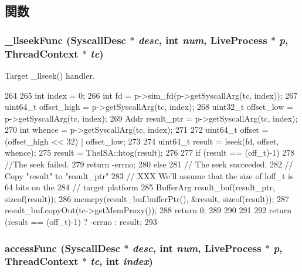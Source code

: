 \subsection{関数}
\hypertarget{syscall__emul_8hh_ab86e19440d57fb509cde4f13d38fffda}{
\subsubsection[{\_\-llseekFunc}]{ \_\-llseekFunc ({\bf SyscallDesc} $\ast$ {\em desc}, \/  int {\em num}, \/  {\bf LiveProcess} $\ast$ {\em p}, \/  {\bf ThreadContext} $\ast$ {\em tc})}}
\label{syscall__emul_8hh_ab86e19440d57fb509cde4f13d38fffda}


Target \_\-llseek() handler. 


\begin{DoxyCode}
264 {
265     int index = 0;
266     int fd = p->sim_fd(p->getSyscallArg(tc, index));
267     uint64_t offset_high = p->getSyscallArg(tc, index);
268     uint32_t offset_low = p->getSyscallArg(tc, index);
269     Addr result_ptr = p->getSyscallArg(tc, index);
270     int whence = p->getSyscallArg(tc, index);
271 
272     uint64_t offset = (offset_high << 32) | offset_low;
273 
274     uint64_t result = lseek(fd, offset, whence);
275     result = TheISA::htog(result);
276 
277     if (result == (off_t)-1) {
278         //The seek failed.
279         return -errno;
280     } else {
281         // The seek succeeded.
282         // Copy "result" to "result_ptr"
283         // XXX We'll assume that the size of loff_t is 64 bits on the
284         // target platform
285         BufferArg result_buf(result_ptr, sizeof(result));
286         memcpy(result_buf.bufferPtr(), &result, sizeof(result));
287         result_buf.copyOut(tc->getMemProxy());
288         return 0;
289     }
290 
291 
292     return (result == (off_t)-1) ? -errno : result;
293 }
\end{DoxyCode}
\hypertarget{syscall__emul_8hh_ad87b62dfcfe55b889d00d3054659a060}{
\subsubsection[{accessFunc}]{ accessFunc ({\bf SyscallDesc} $\ast$ {\em desc}, \/  int {\em num}, \/  {\bf LiveProcess} $\ast$ {\em p}, \/  {\bf ThreadContext} $\ast$ {\em tc}, \/  int {\em index})}}
\label{syscall__emul_8hh_ad87b62dfcfe55b889d00d3054659a060}



